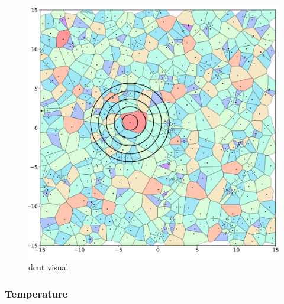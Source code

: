 \begin{figure}
  \center
  \includegraphics[width=\linewidth, height=\textheight,keepaspectratio]{figures/crystalline_voronoi_d_cut_circles.png} 
  \caption{dcut visual}
  \label{fig:dcut}
\end{figure}

\subsubsection{Temperature}


